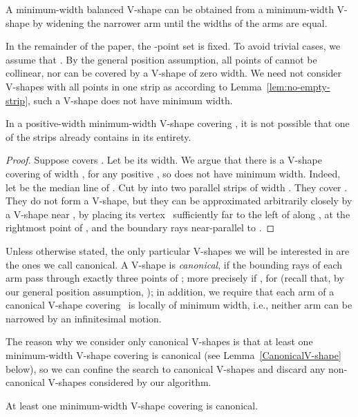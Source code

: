 \documentclass{llncs}
\begin{document}
A minimum-width balanced V-shape can be obtained from a minimum-width 
V-shape by widening the narrower arm until the widths of the arms are equal.

In the remainder of the paper, the -point set  is fixed.  To
avoid trivial cases, we assume that .  By the general
position assumption, all points of  cannot be collinear, nor can
 be covered by a V-shape of zero width. 
We need not consider V-shapes with all points in one strip as according
to Lemma~\ref{lem:no-empty-strip}, 
such a V-shape does not have minimum width.
\begin{lemma}
  \label{lem:no-empty-strip}
  In a positive-width minimum-width V-shape  covering , it is
  not possible that one of the strips already contains  in its
  entirety.
\end{lemma}
\begin{proof}
  Suppose  covers .  Let  be its width.  We argue
  that there is a V-shape covering  of width , for any
  positive , so  does not have minimum width.  Indeed, let
   be the median line of .  Cut  by  into two
  parallel strips of width .  They cover .  They do not form a
  V-shape, but they can be approximated arbitrarily closely by a
  V-shape near , by placing its vertex~ sufficiently far to the
  left of  along ,  at the rightmost point of , and the boundary rays near-parallel to . \hfill 
\end{proof}

Unless otherwise stated, the only particular V-shapes we will be interested in are the ones we call canonical. A V-shape is \emph{canonical}, if the bounding rays of each arm pass through exactly
three points of ; more precisely if ,
for  (recall that, by our general position assumption,
); in addition, we require that each arm
of a canonical V-shape covering~ is locally of minimum width, i.e.,
neither arm can be narrowed by an infinitesimal motion.

The reason why we consider only canonical V-shapes is that 
at least one minimum-width V-shape covering  is canonical (see
Lemma~\ref{CanonicalV-shape} below), so we can 
confine the search to canonical V-shapes and 
discard any non-canonical V-shapes considered by our algorithm.


\begin{lemma}
\label{CanonicalV-shape}
At least one minimum-width V-shape covering  is canonical.
\end{lemma}
\end{document}
